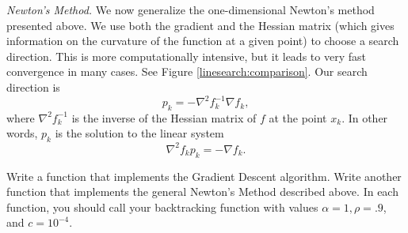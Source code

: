 \emph{Newton's Method.} We now generalize the one-dimensional Newton's method presented above.
We use both the gradient and the Hessian matrix (which gives information on the curvature of the 
function at a given point) to choose a search direction. This is more computationally intensive,
but it leads to very fast convergence in many cases. See Figure
\ref{linesearch:comparison}. Our search direction is
$$
p_k = -\nabla^2 f_k^{-1} \nabla f_k,
$$
where $\nabla^2 f_k^{-1}$ is the inverse of the Hessian matrix of $f$ at the point $x_k$. 
In other words, $p_k$ is the solution to the linear system
$$
\nabla^2 f_k p_k = -\nabla f_k.
$$

\begin{problem}
Write a function  that implements the Gradient Descent algorithm.
Write another function  that implements the general Newton's Method
described above. In each function, you should call your backtracking function with 
values $\alpha = 1, \rho = .9$, and $c = 10^{-4}$. 
\end{problem}

